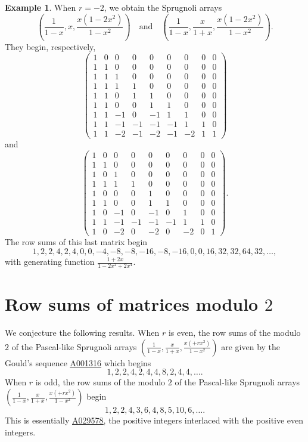 \documentclass[12pt,reqno]{article}
\theoremstyle{definition}
\newtheorem{example}[theorem]{Example}
\newcommand{\seqnum}[1]{\href{http://oeis.org/#1}{\underline{#1}}}
\begin{document}
\begin{example} When $r=-2$, we obtain the Sprugnoli arrays $$\left(\frac{1}{1-x}, x, \frac{x(1-2x^2)}{1-x^2}\right)\quad\text{and}\quad
 \left(\frac{1}{1-x}, \frac{x}{1+x}, \frac{x(1-2x^2)}{1-x^2}\right).$$
 They begin, respectively,
 $$\left(\begin{array}{cccccccccc}
 1 & 0 & 0 & 0 & 0 & 0 & 0 & 0 & 0 \\
1 & 1 & 0 & 0 & 0 & 0 & 0 & 0 & 0 \\
1 & 1 & 1 & 0 & 0 & 0 & 0 & 0 & 0 \\
1 & 1 & 1 & 1 & 0 & 0 & 0 & 0 & 0 \\
1 & 1 & 0 & 1 & 1 & 0 & 0 & 0 & 0 \\
1 & 1 & 0 & 0 & 1 & 1 & 0 & 0 & 0 \\
1 & 1 & -1 & 0 & -1 & 1 & 1 & 0 & 0 \\
1 & 1 & -1 & -1 & -1 & -1 & 1 & 1 & 0 \\
1 & 1 & -2 & -1 & -2 & -1 & -2 & 1 & 1
\end{array}\right)$$ and
 $$\left(\begin{array}{cccccccccc}
 1 & 0 & 0 & 0 & 0 & 0 & 0 & 0 & 0 \\
1 & 1 & 0 & 0 & 0 & 0 & 0 & 0 & 0 \\
1 & 0 & 1 & 0 & 0 & 0 & 0 & 0 & 0 \\
1 & 1 & 1 & 1 & 0 & 0 & 0 & 0 & 0 \\
1 & 0 & 0 & 0 & 1 & 0 & 0 & 0 & 0 \\
1 & 1 & 0 & 0 & 1 & 1 & 0 & 0 & 0 \\
1 & 0 & -1 & 0 & -1 & 0 & 1 & 0 & 0 \\
1 & 1 & -1 & -1 & -1 & -1 & 1 & 1 & 0 \\
1 & 0 & -2 & 0 & -2 & 0 & -2 & 0 & 1
\end{array}\right).$$ The row sums of this last matrix begin
$$1, 2, 2, 4, 2, 4, 0, 0, -4, -8, -8, -16, -8, -16, 0, 0, 16, 32, 32, 64, 32,\ldots,$$ with generating function
$\frac{1+2x}{1-2x^2+2x^4}$.
\end{example}

\section{Row sums of matrices modulo $2$}
We conjecture the following results.
When $r$ is even, the row sums of the modulo $2$ of the Pascal-like Sprugnoli arrays $\left(\frac{1}{1-x},\frac{x}{1+x}, \frac{x(+rx^2)}{1-x^2}\right)$ are given by the Gould's sequence \seqnum{A001316} which begins
$$1, 2, 2, 4, 2, 4, 4, 8, 2, 4, 4,\ldots.$$
When $r$ is odd, the row sums of the modulo $2$ of the Pascal-like Sprugnoli arrays $\left(\frac{1}{1-x},\frac{x}{1+x}, \frac{x(+rx^2)}{1-x^2}\right)$ begin
$$1, 2, 2, 4, 3, 6, 4, 8, 5, 10, 6,\ldots.$$ This is essentially \seqnum{A029578}, the positive integers interlaced with the positive even integers.
\end{document}
